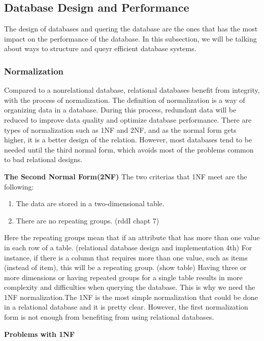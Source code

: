 \subsection{Database Design and Performance}
The design of databases and quering the database are the ones that has the most impact on the performance of the database.
In this subsection, we will be talking about ways to structure and queyr efficient database systems.

\subsubsection[Normalization]{Normalization}
Compared to a nonrelational database, relational databases benefit from integrity, with the process of normalization. 
The definition of normalization is a way of organizing data in a database. 
During this process, redundant data will be reduced to improve data quality and optimize database performance. 
There are types of normalization such as 1NF and 2NF, and as the normal form gets higher, 
it is a better design of the relation. However, most databases tend to be needed until the third normal form, 
which avoids most of the problems common to bad relational designs. 

\textbf{The Second Normal Form(2NF)}
The two criterias that 1NF meet are the following:

\begin{enumerate}
    \item The data are stored in a two-dimensional table.
    \item There are no repeating groups. (rddI chapt 7)
\end{enumerate}


Here the repeating groups mean that if an attribute that has more than one value in each row of a table. (relational database design and implementation 4th) 
For instance, if there is a column that requires more than one value, such as items (instead of item), this will be a repeating group. (show table) 
Having three or more dimensions or having repeated groups for a single table results in more complexity and difficulties when querying the database. 
This is why we need the 1NF normalization.The 1NF is the most simple normalization that could be done in a relational database and it is pretty clear. 
However, the first normalization form is not enough from benefiting from using relational databases. 

\textbf{Problems with 1NF}

